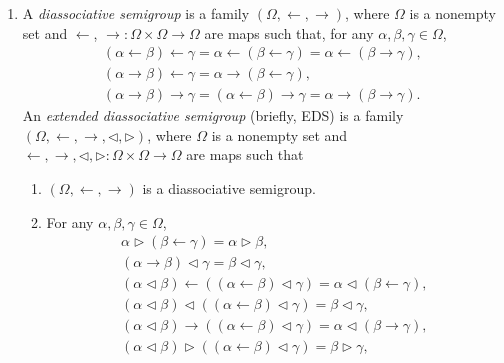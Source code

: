 \documentclass[10pt,a4paper]{amsart}
\numberwithin{equation}{section}
\begin{document}
\begin{Definition}\qquad
\begin{enumerate}\itemsep=0pt
\item[(1)] A \emph{diassociative semigroup} is a family $(\Omega,\leftarrow,\rightarrow)$, where $\Omega$ is a nonempty set and $\leftarrow$, $\rightarrow\colon\Omega\times \Omega \longrightarrow \Omega$ are maps such that, for any $\alpha,\beta,\gamma\in \Omega$,
\begin{gather}%
\label{eq1} (\alpha \leftarrow \beta)\leftarrow \gamma=\alpha\leftarrow (\beta \leftarrow \gamma)=\alpha \leftarrow(\beta \rightarrow \gamma),\\
 (\alpha \rightarrow \beta)\leftarrow \gamma=\alpha \rightarrow (\beta \leftarrow \gamma),\\
 (\alpha \rightarrow \beta)\rightarrow \gamma=(\alpha \leftarrow \beta) \rightarrow \gamma=\alpha \rightarrow (\beta \rightarrow \gamma).
\end{gather}
An \emph{extended diassociative semigroup} (briefly, EDS) is a family $(\Omega,\leftarrow,\rightarrow,\triangleleft,\triangleright)$, where $\Omega$ is a nonempty set
and $\leftarrow,\rightarrow,\triangleleft,\triangleright\colon\Omega\times \Omega \longrightarrow \Omega$ are maps such that
\begin{enumerate}\itemsep=0pt
\item $(\Omega,\leftarrow,\rightarrow)$ is a diassociative semigroup.
\item For any $\alpha,\beta,\gamma \in \Omega$,
\begin{gather}%
\alpha\triangleright (\beta \leftarrow \gamma)=\alpha \triangleright \beta,\\
(\alpha \rightarrow \beta)\triangleleft \gamma=\beta \triangleleft \gamma, \\
(\alpha \triangleleft \beta)\leftarrow ((\alpha \leftarrow \beta) \triangleleft \gamma)=\alpha \triangleleft (\beta \leftarrow \gamma),\\
(\alpha \triangleleft \beta)\triangleleft ((\alpha \leftarrow \beta) \triangleleft \gamma)=\beta \triangleleft \gamma,
\\
(\alpha \triangleleft \beta) \rightarrow ((\alpha \leftarrow \beta) \triangleleft \gamma)=\alpha \triangleleft (\beta \rightarrow \gamma),\\
 (\alpha \triangleleft \beta) \triangleright ((\alpha \leftarrow \beta) \triangleleft \gamma)=\beta \triangleright \gamma,\\

\end{gather}
\end{enumerate}
\end{enumerate}
\end{Definition}
\end{document}

